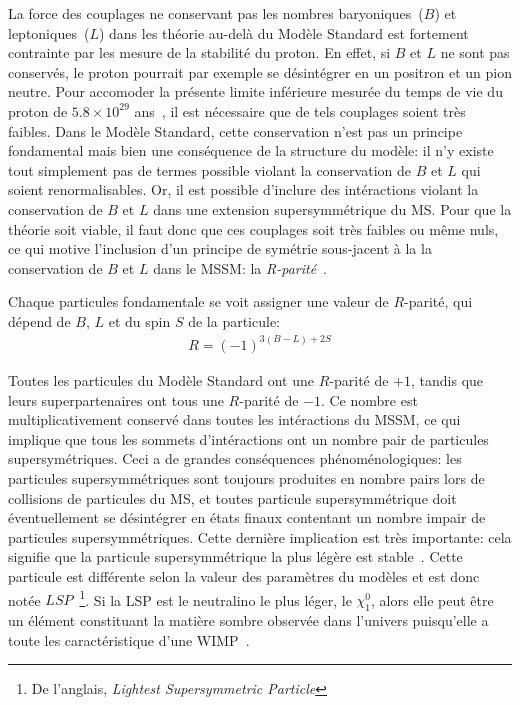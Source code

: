 La force des couplages ne conservant pas les nombres baryoniques~($B$)
et leptoniques~($L$) dans les théorie au-delà du Modèle Standard est
fortement contrainte par les mesure de la stabilité du proton. En
effet, si $B$ et $L$ ne sont pas conservés, le proton pourrait par
exemple se désintégrer en un positron et un pion neutre. Pour
accomoder la présente limite inférieure mesurée du temps de vie du
proton de $5.8 \times 10^{29}$
ans~\cite{kamland_collaboration_search_2006}, il est nécessaire que de
tels couplages soient très faibles.  Dans le Modèle Standard, cette
conservation n'est pas un principe fondamental mais bien une
conséquence de la structure du modèle: il n'y existe tout simplement
pas de termes possible violant la conservation de $B$ et $L$ qui soient
renormalisables. Or, il est possible d'inclure des intéractions
violant la conservation de $B$ et $L$ dans une extension
supersymmétrique du MS. Pour que la théorie soit viable, il faut donc
que ces couplages soit très faibles ou même nuls, ce qui motive
l'inclusion d'un principe de symétrie sous-jacent à la la
conservation de $B$ et $L$ dans le MSSM: la
\emph{R-parité}~\cite{martin_supersymmetry_1997}.

Chaque particules fondamentale se voit assigner une valeur de
$R$-parité, qui dépend de $B$, $L$ et du spin $S$ de la
particule:
\begin{eqnarray}
  R = (-1)^{3(B - L) + 2S}
\end{eqnarray}

Toutes les particules du Modèle Standard ont une $R$-parité de $+1$,
tandis que leurs superpartenaires ont tous une $R$-parité de $-1$. Ce
nombre est multiplicativement conservé dans toutes les intéractions du
MSSM, ce qui implique que tous les sommets d'intéractions ont un
nombre pair de particules supersymétriques. Ceci a de grandes
conséquences phénoménologiques: les particules supersymmétriques sont
toujours produites en nombre pairs lors de collisions de particules du
MS, et toutes particule supersymmétrique doit éventuellement se
désintégrer en états finaux contentant un nombre impair de particules
supersymmétriques. Cette dernière implication est très importante:
cela signifie que la particule supersymmétrique la plus légère est
stable~\cite{martin_supersymmetry_1997}. Cette particule est
différente selon la valeur des paramètres du modèles et est donc notée
$LSP$~\footnote{De l'anglais, \emph{Lightest Supersymmetric
    Particle}}. Si la LSP est le neutralino le plus léger, le
$\chi_1^0$, alors elle peut être un élément constituant la matière
sombre observée dans l'univers puisqu'elle a toute les caractéristique
d'une WIMP~\cite{olive_review_2014}.

